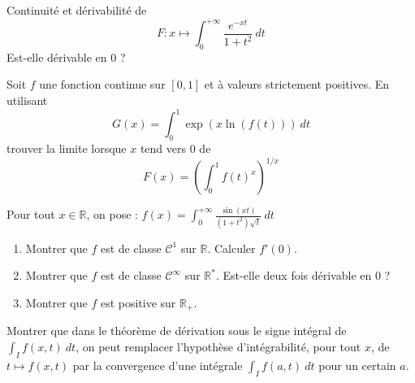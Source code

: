 \documentclass[french,a4paper]{article}
\newcommand{\R}{\mathbb{R}}
\newcommand{\st}{^*}
\theoremstyle{plain}
\theoremstyle{definition}
\theoremstyle{remark}
\begin{document}
\begin{ex}[Moulin.IP.23]{}
	Continuité et dérivabilité de $$F:x\mapsto\int_{0}^{+\infty}\frac{e^{-xt}}{1+t^2}\ dt$$ Est-elle dérivable en $0$ ?
\end{ex}

\begin{ex}[Moulin.IP.24]{}
	Soit $f$ une fonction continue sur $[0,1]$ et à valeurs strictement positives. En utilisant $$G(x)=\int_{0}^{1}\exp(x\ln(f(t)))\ dt$$ trouver la limite lorsque $x$ tend vers $0$ de $$F(x)=\left(\int_{0}^{1}f(t)^x\right)^{1/x}$$
\end{ex}

\begin{ex}[Moulin.IP.25]{}
	Pour tout $x\in\R$, on pose : $f(x)=\displaystyle\int_{0}^{+\infty}\frac{\sin(xt)}{(1+t^2)\sqrt{t}}\ dt$
	\begin{enumerate}
		\item Montrer que $f$ est de classe $\mathcal{C}^1$ sur $\R$. Calculer $f'(0)$.
		\item Montrer que $f$ est de classe $\mathcal{C}^\infty$ sur $\R\st$. Est-elle deux fois dérivable en $0$ ?
		\item Montrer que $f$ est positive sur $\R_+$.
	\end{enumerate}
\end{ex}

\begin{ex}[Moulin.IP.26]{}
	Montrer que dans le théorème de dérivation sous le signe intégral de $\displaystyle\int_If(x,t)\ dt$, on peut remplacer l'hypothèse d'intégrabilité, pour tout $x$, de $t\mapsto f(x,t)$ par la convergence d'une intégrale $\displaystyle\int_I f(a,t)\ dt$ pour un certain $a$.
\end{ex}
\end{document}
